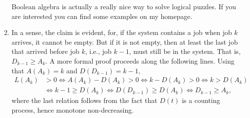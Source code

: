 \begin{question}
\begin{solution}
\begin{enumerate}
  Boolean algebra is actually a really nice way to solve logical
  puzzles. If you are interested you can find some examples on my
  homepage. 
\item In a sense, the claim is evident, for, if the system contains a
  job when job $k$ arrives, it cannot be empty. But if it is not
  empty, then at least the last job that arrived before job $k$, i.e.,
  job $k-1$, must still be in the system. That is, $D_{k-1} \geq A_k$. A more formal proof proceeds along the following lines. Using that $A(A_k) = k$ and $D(D_{k-1})= k-1$, 
  \begin{equation*}
    \begin{split}
      L(A_k) &> 0 \Leftrightarrow A(A_k) - D(A_k) > 0   \Leftrightarrow k - D(A_k) > 0 \Leftrightarrow k > D(A_k) \\
      &\Leftrightarrow k-1 \geq D(A_k) \Leftrightarrow D(D_{k-1}) \geq D(A_k) \Leftrightarrow D_{k-1} \geq A_k, 
    \end{split}
  \end{equation*}
  where the last relation follows from the fact that $D(t)$ is a
  counting process, hence monotone non-decreasing.
  \end{enumerate}

\end{solution}
\end{question}



